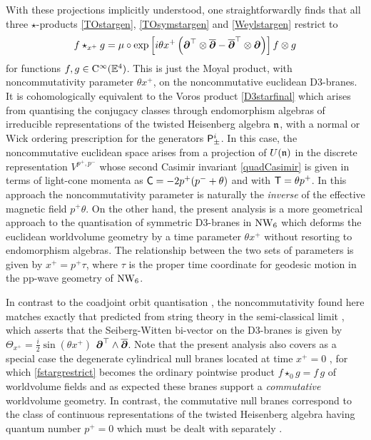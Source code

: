 With these projections implicitly understood, one straightforwardly finds that
all three $\star$-products \eqref{TOstargen}, \eqref{TOsymstargen} and
\eqref{Weylstargen} restrict to
\begin{equation}
  \label{fstargrestrict}
  f\star_{x^+}g=\mu\circ\exp\left[ i \theta x^+ \left(
      \bfd^\top\otimes\overline{\bfd}-
      {\overline{\bfd}}^{ \top}\otimes\bfd\right)\right]f\otimes g
\end{equation}
for functions $f,g\in\CC^\infty(\E^4)$. This is just the Moyal product, with
noncommutativity parameter $\theta x^+$, on the noncommutative euclidean
D3-branes. It is cohomologically equivalent to the Voros product
\eqref{D3starfinal} which arises from quantising the conjugacy classes through
endomorphism algebras of irreducible representations of the twisted Heisenberg
algebra $\mfn$, with a normal or Wick ordering prescription for the generators
$\P_\pm^i$. In this case, the noncommutative euclidean space arises from a
projection of $U(\mfn)$ in the discrete representation $V^{p^+,p^-}$ whose
second Casimir invariant \eqref{quadCasimir} is given in terms of light-cone
momenta as ${\sf C}=-2 p^+ (p^-+\theta)$ and with $\T=\theta p^+$. In this
approach the noncommutativity parameter is naturally the {\it inverse} of the
effective magnetic field $p^+ \theta$. On the other hand, the present analysis
is a more geometrical approach to the quantisation of symmetric D3-branes in
$\NW_6$ which deforms the euclidean worldvolume geometry by a time parameter
$\theta x^+$ without resorting to endomorphism algebras. The relationship
between the two sets of parameters is given by $x^+=p^+ \tau$, where $\tau$ is
the proper time coordinate for geodesic motion in the pp-wave geometry of
$\NW_6$.

In contrast to the coadjoint orbit quantisation \cite{Halliday:2005zt}, the
noncommutativity found here matches exactly that predicted from string theory in
the semi-classical limit \cite{DAK1}, which asserts that the Seiberg-Witten
bi-vector on the D3-branes is given by $\Theta_{x^+}=\frac i 2 \sin(\theta x^+)$
$\bfd^\top\wedge \overline{\bfd}$. Note that the present analysis also covers as
a special case the degenerate cylindrical null branes located at time $x^+=0$
\cite{SF1}, for which \eqref{fstargrestrict} becomes the ordinary pointwise
product $f\star_0g=f\,g$ of worldvolume fields and as expected these branes
support a {\it commutative} worldvolume geometry. In contrast, the commutative
null branes correspond to the class of continuous representations of the twisted
Heisenberg algebra having quantum number $p^+=0$ which must be dealt with
separately \cite{Halliday:2005zt}.


